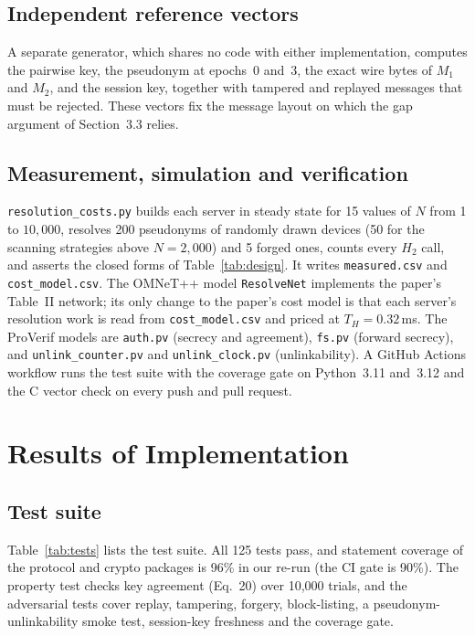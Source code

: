 \subsection*{Independent reference vectors}
A separate generator, which shares no code with either implementation, computes the pairwise key, the pseudonym at epochs~0 and~3, the exact wire bytes of $M_1$ and $M_2$, and the session key, together with tampered and replayed messages that must be rejected. These vectors fix the message layout on which the gap argument of Section~3.3 relies.

\subsection*{Measurement, simulation and verification}
\texttt{resolution\_costs.py} builds each server in steady state for 15 values of $N$ from 1 to $10{,}000$, resolves 200 pseudonyms of randomly drawn devices (50 for the scanning strategies above $N=2{,}000$) and 5 forged ones, counts every $H_2$ call, and asserts the closed forms of Table~\ref{tab:design}. It writes \texttt{measured.csv} and \texttt{cost\_model.csv}. The OMNeT++ model \texttt{ResolveNet} implements the paper's Table~II network; its only change to the paper's cost model is that each server's resolution work is read from \texttt{cost\_model.csv} and priced at $T_H=0.32$\,ms. The ProVerif models are \texttt{auth.pv} (secrecy and agreement), \texttt{fs.pv} (forward secrecy), and \texttt{unlink\_counter.pv} and \texttt{unlink\_clock.pv} (unlinkability). A GitHub Actions workflow runs the test suite with the coverage gate on Python~3.11 and~3.12 and the C vector check on every push and pull request.

\section{Results of Implementation}
\subsection*{Test suite}
Table~\ref{tab:tests} lists the test suite. All 125 tests pass, and statement coverage of the protocol and crypto packages is 96\% in our re-run (the CI gate is 90\%). The property test checks key agreement (Eq.~20) over 10,000 trials, and the adversarial tests cover replay, tampering, forgery, block-listing, a pseudonym-unlinkability smoke test, session-key freshness and the coverage gate.

